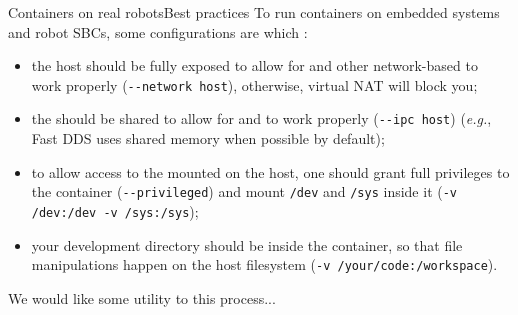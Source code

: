 \begin{frame}{Containers on real robots}{Best practices}
  To run containers on embedded systems and robot SBCs, some configurations are  which :
  \begin{itemize}
    \item the host  should be fully exposed to allow for  and other network-based  to work properly (\texttt{-{}-network host}), otherwise, virtual NAT will block you;
    \item the  should be shared to allow for  and  to work properly (\texttt{-{}-ipc host}) (\emph{e.g.}, Fast DDS uses shared memory when possible by default);
    \item to allow access to the  mounted on the host, one should grant full privileges to the container (\texttt{-{}-privileged}) and mount \texttt{/dev} and \texttt{/sys} inside it (\texttt{-v /dev:/dev -v /sys:/sys});
    \item your development directory should be  inside the container, so that file manipulations happen on the host filesystem (\texttt{-v /your/code:/workspace}).
  \end{itemize}
  We would like some utility to  this process...
\end{frame}
